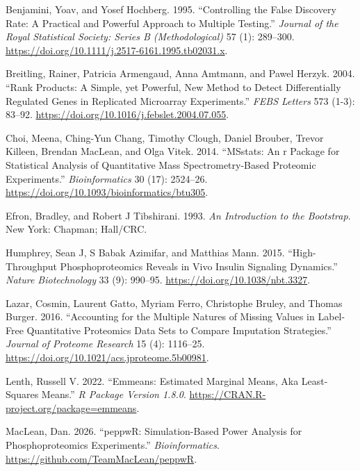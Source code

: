 \documentclass[
]{article}
\newlength{\cslhangindent}
\newenvironment{CSLReferences}[2] %
 {\begin{list}{}{%
  \setlength{\itemindent}{0pt}
  \setlength{\leftmargin}{0pt}
  \setlength{\parsep}{0pt}
  \ifodd #1
   \setlength{\leftmargin}{\cslhangindent}
   \setlength{\itemindent}{-1\cslhangindent}
  \fi
  \setlength{\itemsep}{#2\baselineskip}}}
 {\end{list}}
\begin{document}
\protect{}\label{refs}
\begin{CSLReferences}{1}{0}
Benjamini, Yoav, and Yosef Hochberg. 1995. {``Controlling the False
Discovery Rate: A Practical and Powerful Approach to Multiple
Testing.''} \emph{Journal of the Royal Statistical Society: Series B
(Methodological)} 57 (1): 289--300.
\url{https://doi.org/10.1111/j.2517-6161.1995.tb02031.x}.

Breitling, Rainer, Patricia Armengaud, Anna Amtmann, and Pawel Herzyk.
2004. {``Rank Products: A Simple, yet Powerful, New Method to Detect
Differentially Regulated Genes in Replicated Microarray Experiments.''}
\emph{FEBS Letters} 573 (1-3): 83--92.
\url{https://doi.org/10.1016/j.febslet.2004.07.055}.

Choi, Meena, Ching-Yun Chang, Timothy Clough, Daniel Brouber, Trevor
Killeen, Brendan MacLean, and Olga Vitek. 2014. {``MSstats: An r Package
for Statistical Analysis of Quantitative Mass Spectrometry-Based
Proteomic Experiments.''} \emph{Bioinformatics} 30 (17): 2524--26.
\url{https://doi.org/10.1093/bioinformatics/btu305}.

Efron, Bradley, and Robert J Tibshirani. 1993. \emph{An Introduction to
the Bootstrap}. New York: Chapman; Hall/CRC.

Humphrey, Sean J, S Babak Azimifar, and Matthias Mann. 2015.
{``High-Throughput Phosphoproteomics Reveals in Vivo Insulin Signaling
Dynamics.''} \emph{Nature Biotechnology} 33 (9): 990--95.
\url{https://doi.org/10.1038/nbt.3327}.

Lazar, Cosmin, Laurent Gatto, Myriam Ferro, Christophe Bruley, and
Thomas Burger. 2016. {``Accounting for the Multiple Natures of Missing
Values in Label-Free Quantitative Proteomics Data Sets to Compare
Imputation Strategies.''} \emph{Journal of Proteome Research} 15 (4):
1116--25. \url{https://doi.org/10.1021/acs.jproteome.5b00981}.

Lenth, Russell V. 2022. {``Emmeans: Estimated Marginal Means, Aka
Least-Squares Means.''} \emph{R Package Version 1.8.0}.
\url{https://CRAN.R-project.org/package=emmeans}.

MacLean, Dan. 2026. {``peppwR: Simulation-Based Power Analysis for
Phosphoproteomics Experiments.''} \emph{Bioinformatics}.
\url{https://github.com/TeamMacLean/peppwR}.


\end{CSLReferences}
\end{document}
